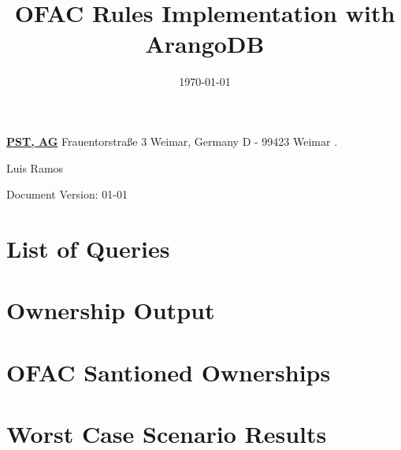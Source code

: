 \documentclass{report}
\title{OFAC Rules Implementation with ArangoDB}  %
\date{\today}
\makeatletter
\renewcommand{\maketitle}{
	\noindent
		{\huge  \bf \href{https://www.pst.ag/}{PST, AG} }  \newline 
		{\footnotesize Frauentorstraße 3} \newline
		{\footnotesize Weimar, Germany} \newline
		D - 99423 Weimar \hfill \newline
	 .{\Large \hfill \@date}
\begin{center}
\pagestyle{empty}
\phantom{.}  %
\vspace{3cm}

{\Huge \bf \@title\par}
\vspace{2.5cm}
{\LARGE Luis Ramos}\\[1cm]
\vspace{4.5cm}

{ Document Version: 01-01}   \\[1cm] 

\end{center}

}\makeatother
\makeatother
\begin{document}
    \maketitle
    \tableofcontents
    
    \appendix
    \chapter{List of Queries}
    
    \chapter{Ownership Output}
    
    \chapter{OFAC Santioned Ownerships}
    
    \chapter{Worst Case Scenario Results}
    
    
   \printglossaries
\end{document}
